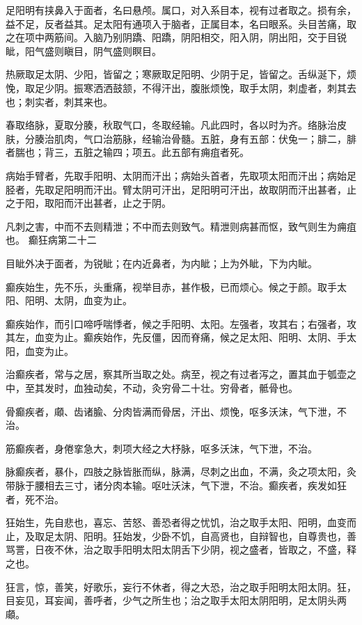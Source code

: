 \documentclass[a4paper,12pt,UTF8,twoside]{ctexbook}
\begin{document}
	足阳明有挟鼻入于面者，名曰悬颅。属口，对入系目本，视有过者取之。损有余，益不足，反者益其。足太阳有通项入于脑者，正属目本，名曰眼系。头目苦痛，取之在项中两筋间。入脑乃别阴蹻、阳蹻，阴阳相交，阳入阴，阴出阳，交于目锐眦，阳气盛则瞋目，阴气盛则瞑目。
	
	热厥取足太阴、少阳，皆留之；寒厥取足阳明、少阴于足，皆留之。舌纵涎下，烦悗，取足少阴。振寒洒洒鼓颔，不得汗出，腹胀烦悗，取手太阴，刺虚者，刺其去也；刺实者，刺其来也。
	
	春取络脉，夏取分腠，秋取气口，冬取经输。凡此四时，各以时为齐。络脉治皮肤，分腠治肌肉，气口治筋脉，经输治骨髓。五脏，身有五部：伏兔一；腓二，腓者腨也；背三，五脏之输四；项五。此五部有痈疽者死。
	
	病始手臂者，先取手阳明、太阴而汗出；病始头首者，先取项太阳而汗出；病始足胫者，先取足阳明而汗出。臂太阴可汗出，足阳明可汗出，故取阴而汗出甚者，止之于阳，取阳而汗出甚者，止之于阴。
	
	凡刺之害，中而不去则精泄；不中而去则致气。精泄则病甚而怄，致气则生为痈疽也。
	癫狂病第二十二
	
	目眦外决于面者，为锐眦；在内近鼻者，为内眦；上为外眦，下为内眦。
	
	癫疾始生，先不乐，头重痛，视举目赤，甚作极，已而烦心。候之于颜。取手太阳、阳明、太阴，血变为止。
	
	癫疾始作，而引口啼呼喘悸者，候之手阳明、太阳。左强者，攻其右；右强者，攻其左，血变为止。癫疾始作，先反僵，因而脊痛，候之足太阳、阳明、太阴、手太阳，血变为止。
	
	治癫疾者，常与之居，察其所当取之处。病至，视之有过者泻之，置其血于瓠壶之中，至其发时，血独动矣，不动，灸穷骨二十壮。穷骨者，骶骨也。
	
	骨癫疾者，顑、齿诸腧、分肉皆满而骨居，汗出、烦悗，呕多沃沫，气下泄，不治。
	
	筋癫疾者，身倦挛急大，刺项大经之大杼脉，呕多沃沫，气下泄，不治。
	
	脉癫疾者，暴仆，四肢之脉皆胀而纵，脉满，尽刺之出血，不满，灸之项太阳，灸带脉于腰相去三寸，诸分肉本输。呕吐沃沫，气下泄，不治。癫疾者，疾发如狂者，死不治。
	
	狂始生，先自悲也，喜忘、苦怒、善恐者得之忧饥，治之取手太阳、阳明，血变而止，及取足太阴、阳明。狂始发，少卧不饥，自高贤也，自辩智也，自尊贵也，善骂詈，日夜不休，治之取手阳明太阳太阴舌下少阴，视之盛者，皆取之，不盛，释之也。
	
	狂言，惊，善笑，好歌乐，妄行不休者，得之大恐，治之取手阳明太阳太阴。狂，目妄见，耳妄闻，善呼者，少气之所生也；治之取手太阳太阴阳明，足太阴头两顑。
	
\end{document}
